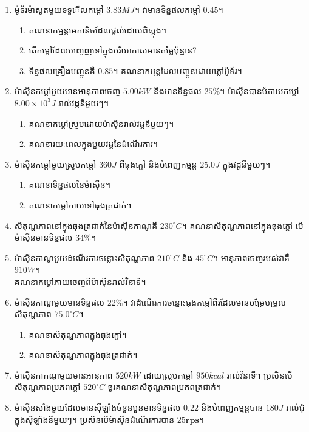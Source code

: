 \begin{enumerate}
	\item ម៉ូទ័រម៉ាស៊ូតមួយទទួើលកម្តៅ $3.83MJ$។ វាមានទិន្នផលកម្តៅ $0.45$។
	\begin{enumerate}
		\item គណនាកម្មន្តមេកានិចដែលផ្តល់ដោយពិស្តុង។
		\item តើកម្តៅដែលបញ្ចេញទៅក្នុងបរិយាកាសមានតម្លៃប៉ុន្មាន?
		\item ទិន្នផលគ្រឿងបញ្ចូនគឺ $0.85$។
			  គណនាកម្មន្តដែលបញ្ចូនដោយភ្លៅម៉ូទ័រ។
	\end{enumerate}
	\item ម៉ាសុីនកម្តៅមួយមានអានុភាពចេញ $5.00kW$ និងមានទិន្នផល $25\%$។ ម៉ាសុីនបានបំភាយកម្តៅ $8.00\times10^{3}J$ រាល់វដ្តនីមួយៗ។
	\begin{enumerate}
		\item គណនាកម្តៅស្រូបដោយម៉ាសុីនរាល់វដ្តនីមួយៗ។
		\item គណនារយៈពេលក្នុងមួយវដ្តនៃដំណើរការ។
	\end{enumerate}
	\item ម៉ាសុីនកម្តៅមួយស្រូបកម្តៅ $360J$ ពីធុងក្តៅ និងបំពេញកម្មន្ត $25.0J$ ក្នុងវដ្តនីមួយៗ។
	\begin{enumerate}
		\item គណនាទិន្នផលនៃម៉ាសុីន។
		\item គណនាកម្តៅភាយទៅធុងត្រជាក់។
	\end{enumerate}
	\item សីតុណ្ហភាពនៅក្នុងធុងត្រជាក់នៃម៉ាសុីនកាណូគឺ $230^\circ C$។ គណនាសីតុណ្ហភាពនៅក្នុងធុងក្តៅ បើម៉ាសុីនមានទិន្នផល $34\%$។
	\item ម៉ាសុីនកាណូមួយដំណើរការចន្លោះសីតុណ្ហភាព $210^\circ C$ និង $45^\circ C$។ អានុភាពចេញរបស់វាគឺ $910W$។\\ គណនាកម្តៅភាយចេញពីម៉ាសុីនរាល់វិនាទី។
	\item ម៉ាសុីនកាណូមួយមានទិន្នផល $22\%$។ វាដំណើរការចន្លោះធុងកម្តៅពីរដែលមានបម្រែបម្រួលសីតុណ្ហភាព $75.0^\circ C$។
	\begin{enumerate}
		\item គណនាសីតុណ្ហភាពក្នុងធុងក្តៅ។
		\item គណនាសីតុណ្ហភាពក្នុងធុងត្រជាក់។
	\end{enumerate}
	\item ម៉ាសុីនកាកណូមួយមានអានុភាព $520kW$ ដោយស្រូបកម្តៅ $950kcal$ រាល់វិនាទី។ ប្រសិនបើសីតុណ្ហភាពប្រភពក្តៅ $520^\circ C$ ចូរគណនាសីតុណ្ហភាពប្រភពត្រជាក់។
	\item ម៉ាសុីនសាំងមួយដែលមានសុីឡាំងចំនួនបួនមានទិន្នផល $0.22$ និងបំពេញកម្មន្តបាន $180J$ រាល់ជុំក្នុងសុីឡាំងនីមួយៗ។ ប្រសិនបើម៉ាសុីនដំណើរការបាន $25\mathbf{rps}$។
	\begin{enumerate}

\end{enumerate}
\end{enumerate}
